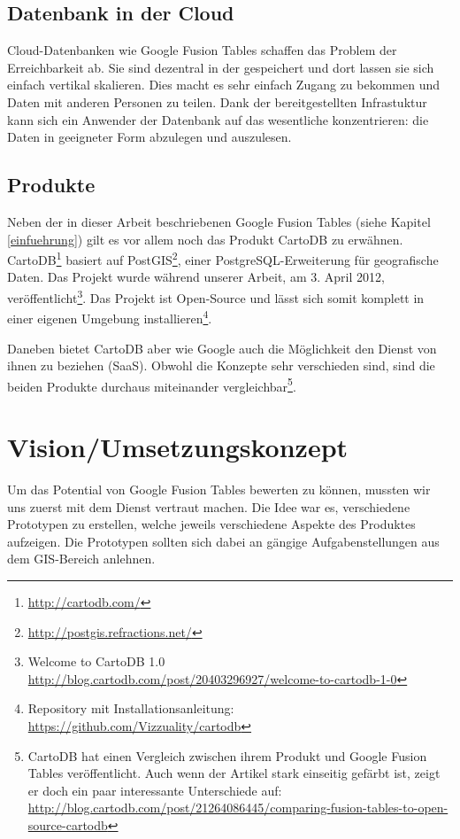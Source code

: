 \subsection{Datenbank in der Cloud}
\gls{Cloud}-Datenbanken wie Google Fusion Tables schaffen das Problem der Erreichbarkeit ab. Sie sind dezentral in der gespeichert und dort lassen sie sich einfach vertikal skalieren. Dies macht es sehr einfach Zugang zu bekommen und Daten mit anderen Personen zu teilen. Dank der bereitgestellten Infrastuktur kann sich ein Anwender der Datenbank auf das wesentliche konzentrieren: die Daten in geeigneter Form abzulegen und auszulesen.

\subsection{Produkte}
Neben der in dieser Arbeit beschriebenen Google Fusion Tables (siehe Kapitel \ref{einfuehrung}) gilt es vor allem noch das Produkt CartoDB zu erwähnen. CartoDB\footnote{\url{http://cartodb.com/}} basiert auf PostGIS\footnote{\url{http://postgis.refractions.net/}}, einer PostgreSQL-Erweiterung für geografische Daten. Das Projekt wurde während unserer Arbeit, am 3. April 2012, veröffentlicht\footnote{Welcome to CartoDB 1.0 \url{http://blog.cartodb.com/post/20403296927/welcome-to-cartodb-1-0}}. Das Projekt ist Open-Source und lässt sich somit komplett in einer eigenen Umgebung installieren\footnote{Repository mit Installationsanleitung: \url{https://github.com/Vizzuality/cartodb}}.

Daneben bietet CartoDB aber wie Google auch die Möglichkeit den Dienst von ihnen zu beziehen (\gls{SaaS}). Obwohl  die Konzepte sehr verschieden sind, sind die beiden Produkte durchaus miteinander vergleichbar\footnote{CartoDB hat einen Vergleich zwischen ihrem Produkt und Google Fusion Tables veröffentlicht. Auch wenn der Artikel stark einseitig gefärbt ist, zeigt er doch ein paar interessante Unterschiede auf: \url{http://blog.cartodb.com/post/21264086445/comparing-fusion-tables-to-open-source-cartodb}}.

\section{Vision/Umsetzungskonzept}
Um das Potential von Google Fusion Tables bewerten zu können, mussten wir uns zuerst mit dem Dienst vertraut machen. Die Idee war es, verschiedene Prototypen zu erstellen, welche jeweils verschiedene Aspekte des Produktes aufzeigen. Die Prototypen sollten sich dabei an gängige Aufgabenstellungen aus dem \gls{GIS}-Bereich anlehnen.

